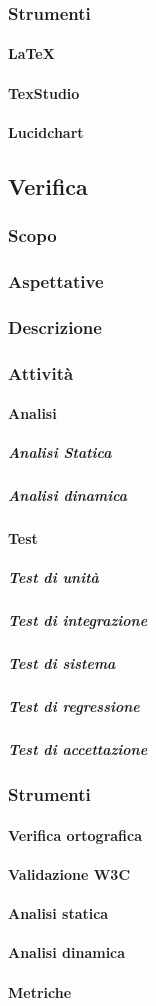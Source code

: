 	\subsubsection{Strumenti}
		\paragraph{\LaTeX}
		\paragraph{TexStudio}
		\paragraph{Lucidchart}
	
\subsection{Verifica}

	\subsubsection{Scopo}
	\subsubsection{Aspettative}
	\subsubsection{Descrizione}
	\subsubsection{Attività}
		\paragraph{Analisi}
			\subparagraph{Analisi Statica}
			\subparagraph{Analisi dinamica}
		\paragraph{Test}
			\subparagraph{Test di unità}
			\subparagraph{Test di integrazione}
			\subparagraph{Test di sistema}
			\subparagraph{Test di regressione}					
			\subparagraph{Test di accettazione}
	\subsubsection{Strumenti}
			\paragraph{Verifica ortografica}
			\paragraph{Validazione W3C}
			\paragraph{Analisi statica}
			\paragraph{Analisi dinamica}
			\paragraph{Metriche}
			